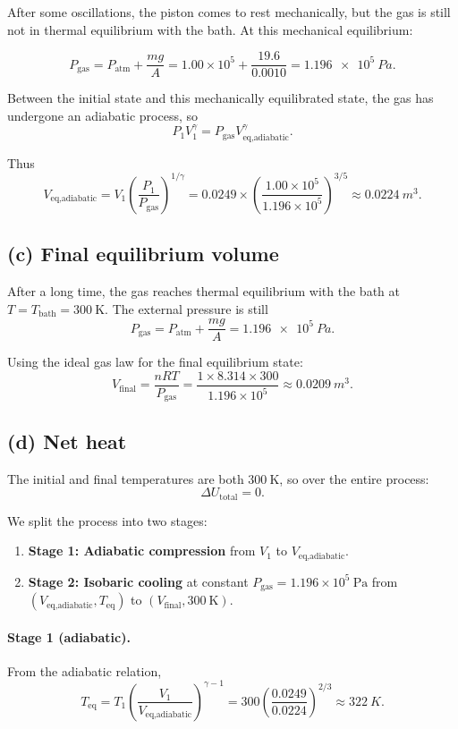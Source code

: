\documentclass[11pt]{article}
\newcommand{\ans}[1]{\boxed{\displaystyle #1}}
\begin{document}
After some oscillations, the piston comes to rest mechanically, but the gas is still not in thermal equilibrium with the bath. At this mechanical equilibrium:

\[
P_{\text{gas}} = P_{\text{atm}} + \frac{mg}{A}
= 1.00 \times 10^5 + \frac{19.6}{0.0010}
= \SI{1.196e5}{Pa}.
\]

Between the initial state and this mechanically equilibrated state, the gas has undergone an adiabatic process, so
\[
P_1 V_1^{\gamma} = P_{\text{gas}} V_{\text{eq,adiabatic}}^{\gamma}.
\]

Thus
\[
V_{\text{eq,adiabatic}}
= V_1 \left(\frac{P_1}{P_{\text{gas}}}\right)^{1/\gamma}
= 0.0249 \times \left(\frac{1.00 \times 10^5}{1.196 \times 10^5}\right)^{3/5}
\approx \ans{\SI{0.0224}{m^3}}.
\]

\subsection*{(c) Final equilibrium volume}

After a long time, the gas reaches thermal equilibrium with the bath at \(T = T_{\text{bath}} = 300~\text{K}\). The external pressure is still
\[
P_{\text{gas}} = P_{\text{atm}} + \frac{mg}{A}
= \SI{1.196e5}{Pa}.
\]

Using the ideal gas law for the final equilibrium state:
\[
V_{\text{final}}
= \frac{nRT}{P_{\text{gas}}}
= \frac{1 \times 8.314 \times 300}{1.196 \times 10^5}
\approx \ans{\SI{0.0209}{m^3}}.
\]

\subsection*{(d) Net heat}

The initial and final temperatures are both \(300~\text{K}\), so over the entire process:
\[
\Delta U_{\text{total}} = 0.
\]

We split the process into two stages:

\begin{enumerate}
\item \textbf{Stage 1: Adiabatic compression} from \(V_1\) to \(V_{\text{eq,adiabatic}}\).
\item \textbf{Stage 2: Isobaric cooling} at constant \(P_{\text{gas}} = 1.196\times 10^5\ \text{Pa}\) from
\((V_{\text{eq,adiabatic}}, T_{\text{eq}})\) to \((V_{\text{final}}, 300~\text{K})\).
\end{enumerate}

\paragraph{Stage 1 (adiabatic).}
From the adiabatic relation,
\[
T_{\text{eq}} = T_1\left(\frac{V_1}{V_{\text{eq,adiabatic}}}\right)^{\gamma-1}
= 300 \left(\frac{0.0249}{0.0224}\right)^{2/3}
\approx \SI{322}{K}.
\]
\end{document}
